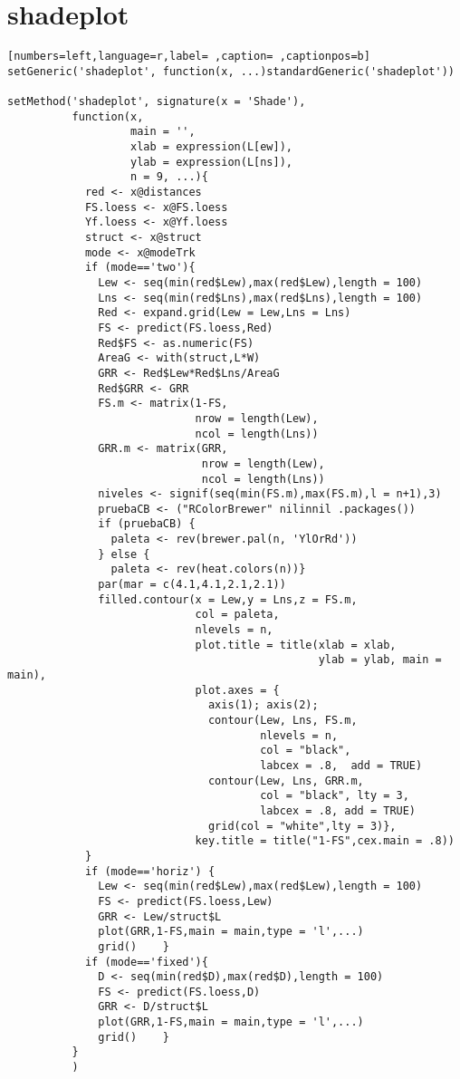 \section{shadeplot}
\label{sec:org63f00f5}
\begin{lstlisting}[numbers=left,language=r,label= ,caption= ,captionpos=b]
setGeneric('shadeplot', function(x, ...)standardGeneric('shadeplot'))

setMethod('shadeplot', signature(x = 'Shade'),
          function(x,
                   main = '',
                   xlab = expression(L[ew]),
                   ylab = expression(L[ns]),
                   n = 9, ...){
            red <- x@distances
            FS.loess <- x@FS.loess
            Yf.loess <- x@Yf.loess
            struct <- x@struct
            mode <- x@modeTrk
            if (mode=='two'){
              Lew <- seq(min(red$Lew),max(red$Lew),length = 100)
              Lns <- seq(min(red$Lns),max(red$Lns),length = 100)
              Red <- expand.grid(Lew = Lew,Lns = Lns)
              FS <- predict(FS.loess,Red)
              Red$FS <- as.numeric(FS)
              AreaG <- with(struct,L*W)
              GRR <- Red$Lew*Red$Lns/AreaG
              Red$GRR <- GRR
              FS.m <- matrix(1-FS,
                             nrow = length(Lew),
                             ncol = length(Lns))
              GRR.m <- matrix(GRR,
                              nrow = length(Lew),
                              ncol = length(Lns))
              niveles <- signif(seq(min(FS.m),max(FS.m),l = n+1),3)
              pruebaCB <- ("RColorBrewer" nilinnil .packages())
              if (pruebaCB) {
                paleta <- rev(brewer.pal(n, 'YlOrRd'))
              } else {
                paleta <- rev(heat.colors(n))}
              par(mar = c(4.1,4.1,2.1,2.1)) 
              filled.contour(x = Lew,y = Lns,z = FS.m,
                             col = paleta, 
                             nlevels = n,
                             plot.title = title(xlab = xlab,
                                                ylab = ylab, main = main),
                             plot.axes = {
                               axis(1); axis(2);
                               contour(Lew, Lns, FS.m,
                                       nlevels = n, 
                                       col = "black",
                                       labcex = .8,  add = TRUE)
                               contour(Lew, Lns, GRR.m,
                                       col = "black", lty = 3,
                                       labcex = .8, add = TRUE)
                               grid(col = "white",lty = 3)},
                             key.title = title("1-FS",cex.main = .8))
            }
            if (mode=='horiz') {
              Lew <- seq(min(red$Lew),max(red$Lew),length = 100)
              FS <- predict(FS.loess,Lew)
              GRR <- Lew/struct$L
              plot(GRR,1-FS,main = main,type = 'l',...)
              grid()    }
            if (mode=='fixed'){
              D <- seq(min(red$D),max(red$D),length = 100)
              FS <- predict(FS.loess,D)
              GRR <- D/struct$L
              plot(GRR,1-FS,main = main,type = 'l',...)
              grid()    }
          }
          )
\end{lstlisting}
